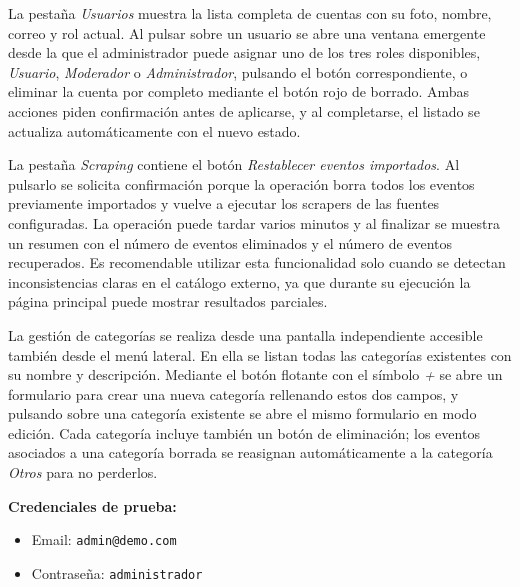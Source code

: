 La pestaña \textit{Usuarios} muestra la lista completa de cuentas con su foto, nombre, correo y rol actual. Al pulsar sobre un usuario se abre una ventana emergente desde la que el administrador puede asignar uno de los tres roles disponibles, \textit{Usuario}, \textit{Moderador} o \textit{Administrador}, pulsando el botón correspondiente, o eliminar la cuenta por completo mediante el botón rojo de borrado. Ambas acciones piden confirmación antes de aplicarse, y al completarse, el listado se actualiza automáticamente con el nuevo estado.

La pestaña \textit{Scraping} contiene el botón \textit{Restablecer eventos importados}. Al pulsarlo se solicita confirmación porque la operación borra todos los eventos previamente importados y vuelve a ejecutar los scrapers de las fuentes configuradas. La operación puede tardar varios minutos y al finalizar se muestra un resumen con el número de eventos eliminados y el número de eventos recuperados. Es recomendable utilizar esta funcionalidad solo cuando se detectan inconsistencias claras en el catálogo externo, ya que durante su ejecución la página principal puede mostrar resultados parciales.

La gestión de categorías se realiza desde una pantalla independiente accesible también desde el menú lateral. En ella se listan todas las categorías existentes con su nombre y descripción. Mediante el botón flotante con el símbolo \textit{+} se abre un formulario para crear una nueva categoría rellenando estos dos campos, y pulsando sobre una categoría existente se abre el mismo formulario en modo edición. Cada categoría incluye también un botón de eliminación; los eventos asociados a una categoría borrada se reasignan automáticamente a la categoría \textit{Otros} para no perderlos.

\bigskip

\textbf{Credenciales de prueba:}
\begin{itemize}[leftmargin=1.5em]
\item Email: \texttt{admin@demo.com}
\item Contraseña: \texttt{administrador}
\end{itemize}

